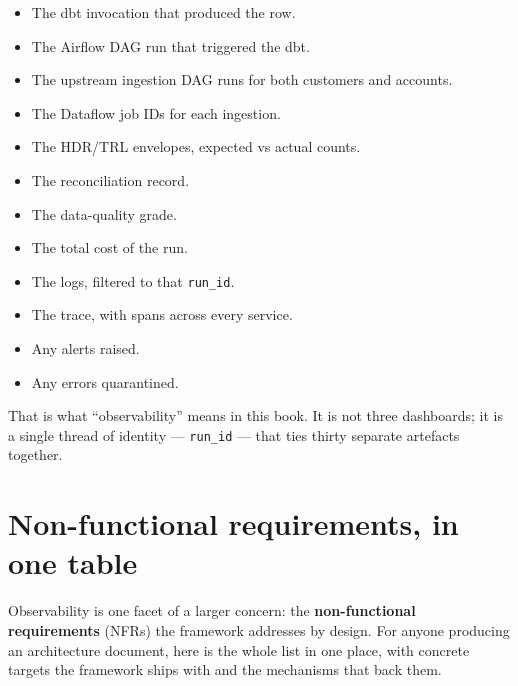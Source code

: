 \documentclass[
  11pt,
  british,
  oneside]{book}
\providecommand{\tightlist}{%
  \setlength{\itemsep}{0pt}\setlength{\parskip}{0pt}}
\begin{document}
\begin{itemize}
\tightlist
\item
  The dbt invocation that produced the row.
\item
  The Airflow DAG run that triggered the dbt.
\item
  The upstream ingestion DAG runs for both customers and accounts.
\item
  The Dataflow job IDs for each ingestion.
\item
  The HDR/TRL envelopes, expected vs actual counts.
\item
  The reconciliation record.
\item
  The data-quality grade.
\item
  The total cost of the run.
\item
  The logs, filtered to that \texttt{run\_id}.
\item
  The trace, with spans across every service.
\item
  Any alerts raised.
\item
  Any errors quarantined.
\end{itemize}

That is what ``observability'' means in this book. It is not three
dashboards; it is a single thread of identity --- \texttt{run\_id} ---
that ties thirty separate artefacts together.

\hypertarget{non-functional-requirements-in-one-table}{%
\section{Non-functional requirements, in one
table}\label{non-functional-requirements-in-one-table}}

Observability is one facet of a larger concern: the
\textbf{non-functional requirements} (NFRs) the framework addresses by
design. For anyone producing an architecture document, here is the whole
list in one place, with concrete targets the framework ships with and
the mechanisms that back them.
\end{document}
